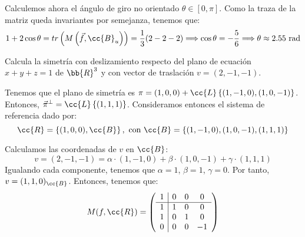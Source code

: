 \begin{ejercicio}
    Calculemos ahora el ángulo de giro no orientado $\theta \in [0, \pi]$. Como la traza de la matriz queda invariantes por semejanza, tenemos que:
    \begin{equation*}
        1+2\cos\theta = tr\left(M\left(\vec{f}, \cc{B}_u\right)\right) = \frac{1}{3}(2 -2 -2) \Longrightarrow \cos\theta = -\frac{5}{6} \Longrightarrow \theta \approx 2.55 \text{ rad}
    \end{equation*}
\end{ejercicio}

\begin{ejercicio}
    Calcula la simetría con deslizamiento respecto del plano de ecuación $x + y + z = 1$ de $\bb{R}^3$ y con vector de traslación $v = (2, -1, -1)$.

    Tenemos que el plano de simetría es $\pi = (1,0,0) + \cc{L}\left\{(1,-1,0), (1,0,-1)\right\}$. Entonces, $\vec{\pi}^\perp = \cc{L}\left\{(1,1,1)\right\}$.
    Consideramos entonces el sistema de referencia dado por:
    \begin{equation*}
        \cc{R} = \left\{(1,0,0), \cc{B}\right\}, \text{ con } \cc{B} = \left\{(1,-1,0), (1,0,-1), (1,1,1)\right\}
    \end{equation*}

    Calculamos las coordenadas de $v$ en $\cc{B}$:
    \begin{equation*}
        v = (2,-1,-1) = \alpha\cdot (1,-1,0) + \beta\cdot (1,0,-1) + \gamma\cdot (1,1,1)
    \end{equation*}
    Igualando cada componente, tenemos que $\alpha = 1$, $\beta = 1$, $\gamma = 0$. Por tanto, $v = (1,1,0)_{\cc{B}}$. Entonces, tenemos que:
    \begin{equation*}
        M(f, \cc{R}) = \left(
        \begin{array}{c|ccc}
            1 & 0 & 0 & 0 \\ \hline
            1 & 1 & 0 & 0 \\
            1 & 0 & 1 & 0 \\
            0 & 0 & 0 & -1
        \end{array}
        \right)
    \end{equation*}


\end{ejercicio}
